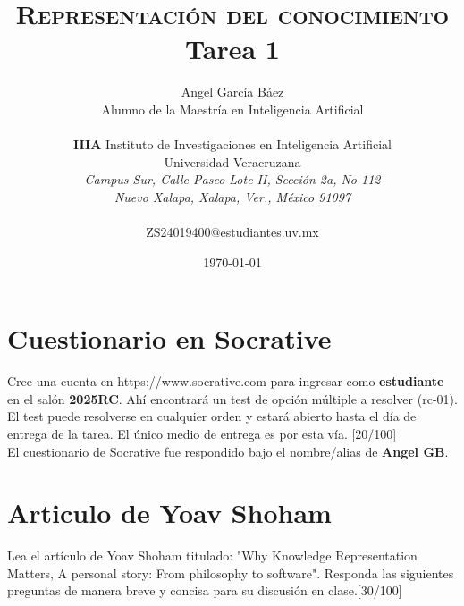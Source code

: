 \documentclass[11pt, letterpaper]{article}
\title{\textsc{Representación del conocimiento} \\
	Tarea 1
}
\author{Angel García Báez\\
	Alumno de la Maestría en Inteligencia Artificial \\ \\ \textbf{IIIA}
	Instituto de Investigaciones en Inteligencia Artificial \\
	Universidad Veracruzana \\ \emph{Campus Sur, Calle Paseo Lote II,
		Sección 2a, No 112} \\ \emph{Nuevo Xalapa, Xalapa, Ver., México 91097}
	\\ \\ ZS24019400@estudiantes.uv.mx}
\date{\today}
\begin{document}
	
	
	\maketitle
	
	\section{Cuestionario en Socrative}
	
	Cree una cuenta en https://www.socrative.com para ingresar como \textbf{estudiante} en el salón \textbf{2025RC}. Ahí encontrará un test de opción múltiple a resolver (rc-01). El test puede resolverse en cualquier orden y estará abierto hasta el día de entrega de la tarea. El único medio de entrega es por esta vía. [20/100] \\
	
	El cuestionario de Socrative fue respondido bajo el nombre/alias de \textbf{Angel GB}.
	
	\newpage
	
	\section{Articulo de Yoav Shoham}
	Lea el artículo de Yoav Shoham titulado: "Why Knowledge Representation Matters, A personal story: From philosophy to software". Responda las siguientes preguntas de manera breve y concisa para su discusión en clase.[30/100]
	
\end{document}
